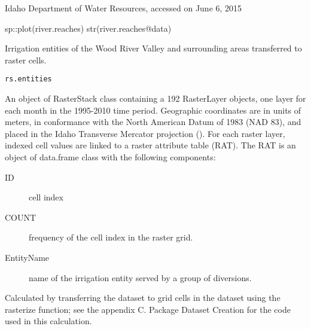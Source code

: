 \documentclass[a4paper]{book}
\begin{document}
%
\begin{Source}\relax
Idaho Department of Water Resources, accessed on June 6, 2015
\end{Source}
%
\begin{Examples}
\begin{ExampleCode}
sp::plot(river.reaches)
str(river.reaches@data)

\end{ExampleCode}
\end{Examples}
%
\begin{Description}\relax
Irrigation entities of the Wood River Valley and surrounding areas transferred to raster cells.
\end{Description}
%
\begin{Usage}
\begin{verbatim}
rs.entities
\end{verbatim}
\end{Usage}
%
\begin{Format}
An object of RasterStack class containing a 192 RasterLayer objects,
one layer for each month in the 1995-2010 time period.
Geographic coordinates are in units of meters, in conformance with the
North American Datum of 1983 (NAD 83), and placed in the
Idaho Transverse Mercator projection ().
For each raster layer, indexed cell values are linked to a raster attribute table (RAT).
The RAT is an object of data.frame class with the following components:
\begin{description}

\item[ID] cell index
\item[COUNT] frequency of the cell index in the raster grid.
\item[EntityName] name of the irrigation entity served by a group of diversions.

\end{description}

\end{Format}
%
\begin{Source}\relax
Calculated by transferring the  dataset to grid cells
in the  dataset using the rasterize function;
see the appendix C. Package Dataset Creation for the \R{} code used in this calculation.
\end{Source}
\end{document}
